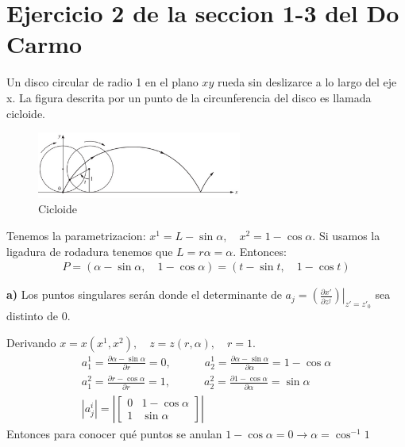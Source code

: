\documentclass{article}
\begin{document}
\section{Ejercicio 2 de la seccion 1-3 del Do Carmo }
Un disco circular de radio 1 en el plano $ xy  $ rueda sin deslizarce a lo largo del eje x. La figura descrita por un punto de la circunferencia del disco es llamada cicloide. 
\begin{figure}[H]
  \begin{center}
    \includegraphics[width=0.6\textwidth]{figures/cicloide-do-carmo.png}
  \end{center}
  \caption{Cicloide}
  \label{fig:cicloide}
\end{figure}
Tenemos la parametrizacion: $ x ^ {1 } = L - \sin{\alpha}, \quad x ^ {2 } = 1- \cos{\alpha} $. Si usamos la ligadura de rodadura tenemos que $ L = r \alpha = \alpha $. Entonces: 
\begin{gather*}
  P = (\alpha - \sin{\alpha}, \quad 1 - \cos{\alpha}) = (t - \sin{t}, \quad 1 - \cos{t})
\end{gather*}

\textbf{a) }Los puntos singulares serán donde el determinante de $ a_j = \left. \left(\frac{\partial x'  }{\partial z ^ {j }}\right)\right|_{z' = z'_0}  $ sea distinto de 0. 

Derivando $ x = x(x ^ {1 }, x ^ {2 }), \quad z = z(r,\alpha), \quad r = 1  $. 
\begin{gather*}
  a_1 ^ {1 } = \frac{\partial \alpha-\sin{\alpha} }{\partial r} = 0 , \qquad \quad a _{2 } ^ {1 } = \frac{\partial \alpha- \sin{\alpha} }{\partial \alpha} = 1- \cos{\alpha}\\
  a _{1 } ^ {2 } = \frac{\partial r - \cos{\alpha} }{\partial r} = 1, \qquad \quad a _{2 } ^ {2 } = \frac{\partial 1- \cos{\alpha} }{\partial \alpha} = \sin{\alpha}\\
  \left|a _{j } ^ {i }\right| = \left|\begin{bmatrix}
      0 & 1-\cos{\alpha} \\
      1  & \sin{\alpha}
  \end{bmatrix}  \right|
\end{gather*}
Entonces para conocer qué puntos se anulan $ 1- \cos{\alpha} = 0 \rightarrow \alpha = \cos^ {-1}{1 } $
\end{document}
